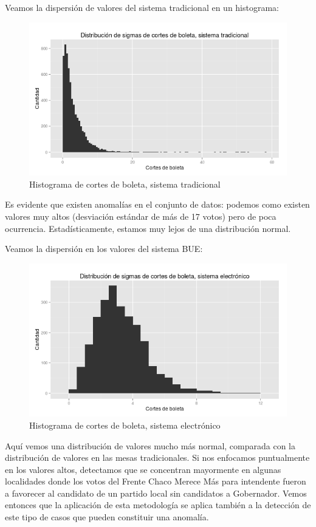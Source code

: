 \documentclass[12pt,a4paper]{article}
\begin{document}
Veamos la dispersión de valores del sistema tradicional en un histograma:

\begin{figure}[h]
\centering
    \includegraphics[width=\textwidth]{sigmas_tradicional}
\caption{Histograma de cortes de boleta, sistema tradicional}
\end{figure}

Es evidente que existen anomalías en el conjunto de datos: podemos como existen
valores muy altos (desviación estándar de más de 17 votos) pero de poca
ocurrencia. Estadísticamente, estamos muy lejos de una distribución normal.

Veamos la dispersión en los valores del sistema BUE:

\begin{figure}[h]
\centering
    \includegraphics[width=\textwidth]{sigmas_electronico}
\caption{Histograma de cortes de boleta, sistema electrónico}
\end{figure}

Aquí vemos una distribución de valores mucho más normal, comparada con la
distribución de valores en las mesas tradicionales.
Si nos enfocamos puntualmente en los valores altos, detectamos que se concentran mayormente en
algunas localidades donde los votos del Frente Chaco Merece Más para intendente
fueron a favorecer al candidato de un partido local sin candidatos a Gobernador.
Vemos entonces que la aplicación de esta metodología se aplica también a la
detección de este tipo de casos que pueden constituir una anomalía.
\end{document}
